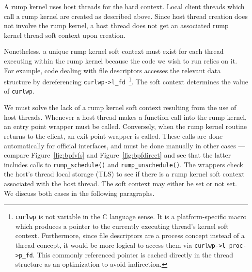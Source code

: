 A rump kernel uses host threads for the hard context.  Local client
threads which call a rump kernel are created as described
above.  Since host thread creation does not involve the rump kernel,
a host thread does not get an associated rump kernel thread soft context
upon creation.

Nonetheless, a unique rump kernel soft context must exist for
each thread executing within the rump kernel because the code we
wish to run relies on it.  For example, code dealing with file
descriptors accesses the relevant data structure by dereferencing
\verb+curlwp->l_fd+~\footnote
{
	\texttt{curlwp} is not variable in the C language sense.
	It is a platform-specific macro which produces a pointer
	to the currently executing thread's kernel soft context.
	Furthermore, since file descriptors are a process concept
	instead of a thread concept, it would be more logical to
	access them via \texttt{curlwp->l\_proc->p\_fd}.
	This commonly referenced pointer is cached directly in
	the thread structure as an optimization to avoid indirection.
}.
The soft context determines the value of \texttt{curlwp}.

We must solve the lack of a rump kernel soft context resulting from the
use of host threads.  Whenever a host thread makes a function call into
the rump kernel, an entry point wrapper must be called.  Conversely,
when the rump kernel routine returns to the client, an exit point wrapper is called.
These calls are done automatically for official interfaces, and must
be done manually in other cases --- compare Figure~\ref{fig:bpfvfs}
and Figure~\ref{fig:bpfdirect} and see that the latter includes calls
to \verb+rump_schedule()+ and \verb+rump_unschedule()+.  The wrappers
check the host's thread local storage (TLS) to see if there is a rump
kernel soft context associated with the host thread.
The soft context may either be set or not set.  We discuss
both cases in the following paragraphs.

